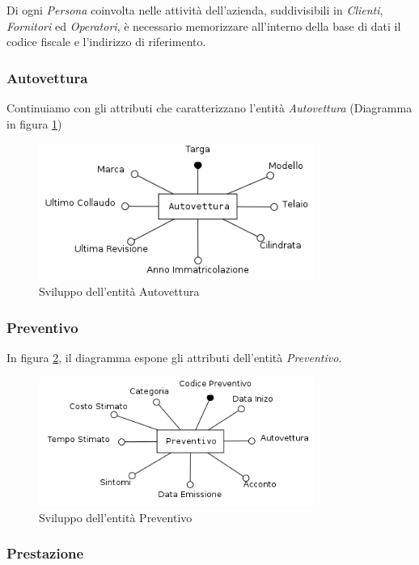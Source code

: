 			Di ogni \emph{Persona} coinvolta nelle attività dell'azienda, suddivisibili in \emph{Clienti}, \emph{Fornitori} ed \emph{Operatori}, è necessario memorizzare all'interno della base di dati il codice fiscale e l'indirizzo di riferimento.
		
		\subsubsection{Autovettura}
			
			Continuiamo con gli attributi che caratterizzano l'entità \emph{Autovettura} (Diagramma in figura \ref{fig:autovettura})
			
			\begin{figure}[H]
				\centering
				\includegraphics[width=9cm]{images/finitures/autovettura.png}
				\caption{Sviluppo dell'entità Autovettura}
				\label{fig:autovettura}
			\end{figure}
			
		\subsubsection{Preventivo}
		
			In figura \ref{fig:preventivo}, il diagramma espone gli attributi dell'entità \emph{Preventivo}.
			
			\begin{figure}[H]
				\centering
				\includegraphics[width=9cm]{images/finitures/preventivo.png}
				\caption{Sviluppo dell'entità Preventivo}
				\label{fig:preventivo}
			\end{figure}
		
		\subsubsection{Prestazione}
			
